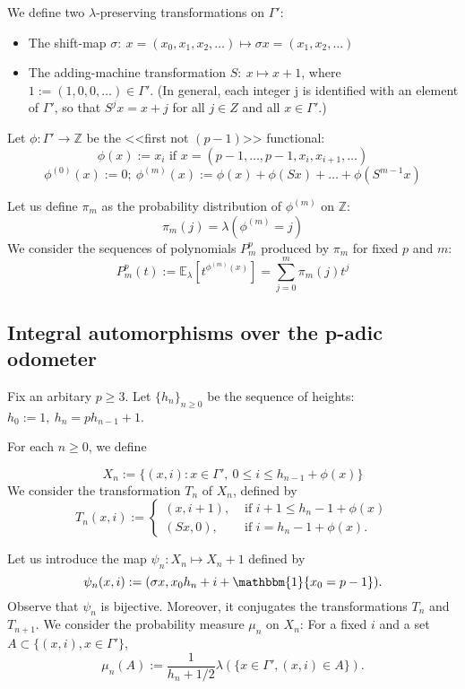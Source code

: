 \documentclass[a4paper]{article}
\theoremstyle{plain}
\theoremstyle{definition}
\begin{document}
    We define two $\lambda$-preserving transformations on $\Gamma'$:
    \begin{itemize}
    \item The shift-map $\sigma:\ x=\left(x_0, x_1, x_2, \ldots \right) \mapsto \sigma x = \left(x_1, x_2, \ldots \right)$
    \item The adding-machine transformation $S:\ x \mapsto x + 1$, where $1:=(1,0,0,\ldots) \in \Gamma'$. (In general, each integer j is
identified with an element of $\Gamma'$, so that $S^jx = x + j$ for all $j \in Z$ and all
$x \in \Gamma'$.)
    \end{itemize}
    Let $\phi: \Gamma' \rightarrow \mathbb{Z}$ be the <<first not $(p-1)$>> functional:\\
    \[\phi(x):=x_i\text{ if }x=(p-1, \ldots, p-1, x_i, x_{i+1}, \ldots)\]
    \[\phi^{(0)}(x):=0;\ \phi^{(m)}(x):=\phi(x)+\phi(Sx)+\ldots+\phi(S^{m-1}x)\]

Let us define $\pi_m$ as the probability distribution of $\phi^{(m)}$ on $\mathbb{Z}$:
    \[\pi_m(j) = \lambda(\phi^{(m)}=j)\]
    We consider the sequences of polynomials $P_m^p$ produced by $\pi_m$ for fixed $p$ and $m$:
    \[P_m^p(t):= \mathbb{E}_\lambda\left[ t^{\phi^{(m)}(x)}\right] = \sum\limits_{j=0}^m \pi_m(j) t^j \]
    
\subsection{Integral automorphisms over the p-adic odometer}
Fix an arbitary $p \ge 3$. Let $\{h_n\}_{n \ge 0}$ be the sequence of heights: $h_0 := 1,\ h_n = ph_{n-1}+1$.

For each $n \ge 0$, we define

$$X_n:=\{(x,i): x \in \Gamma',\ 0 \le i \le h_{n-1} + \phi(x)\}$$
We consider the transformation $T_n$ of $X_n$, defined by
$$T_n(x, i) := \begin{cases}
(x,i+1), & \text{ if } i+1 \le h_n - 1 + \phi(x) \\
(Sx,0), & \text{ if } i=h_n-1+\phi(x). \end{cases}$$

Let us introduce the map $\psi_n : X_n \mapsto X_n+1$ defined by
$$\psi_n(x,i):=(\sigma x, x_0 h_n + i + \mathbbm{1}\{x_0=p-1\}).$$
Observe that $\psi_n$ is bijective. Moreover, it conjugates the transformations $T_n$ and
$T_{n+1}$. We consider the probability measure $\mu_n$ on $X_n$: For a fixed $i$ and a set
$A \subset \{(x, i), x\in\Gamma' \}$,
$$\mu_n(A):=\frac{1}{h_n + 1/2} \lambda (\{x \in \Gamma', (x, i) \in A\}).$$
\end{document}
